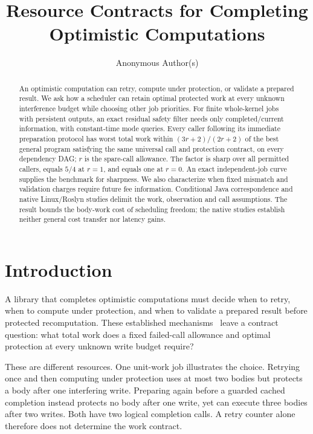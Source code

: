 \documentclass[acmsmall,screen,review,anonymous]{acmart}
\title{Resource Contracts for Completing Optimistic Computations}
\author{Anonymous Author(s)}
\begin{document}
\begin{abstract}
An optimistic computation can retry, compute under protection, or validate a prepared result. We ask how a scheduler can retain optimal protected work at every unknown interference budget while choosing other job priorities. For finite whole-kernel jobs with persistent outputs, an exact residual safety filter needs only completed/current information, with constant-time mode queries. Every caller following its immediate preparation protocol has worst total work within $(3r+2)/(2r+2)$ of the best general program satisfying the same universal call and protection contract, on every dependency DAG; $r$ is the spare-call allowance. The factor is sharp over all permitted callers, equals $5/4$ at $r=1$, and equals one at $r=0$. An exact independent-job curve supplies the benchmark for sharpness. We also characterize when fixed mismatch and validation charges require future fee information. Conditional Java correspondence and native Linux/Roslyn studies delimit the work, observation and call assumptions. The result bounds the body-work cost of scheduling freedom; the native studies establish neither general cost transfer nor latency gains.
\end{abstract}

\maketitle
\fancyfoot{}\thispagestyle{fancy}

\section{Introduction}

A library that completes optimistic computations must decide when to retry, when to compute under protection, and when to validate a prepared result before protected recomputation. These established mechanisms~\cite{welc2008,maldonado2011} leave a contract question: what total work does a fixed failed-call allowance and optimal protection at every unknown write budget require?

These are different resources. One unit-work job illustrates the choice. Retrying once and then computing under protection uses at most two bodies but protects a body after one interfering write. Preparing again before a guarded cached completion instead protects no body after one write, yet can execute three bodies after two writes. Both have two logical completion calls. A retry counter alone therefore does not determine the work contract.
\end{document}
